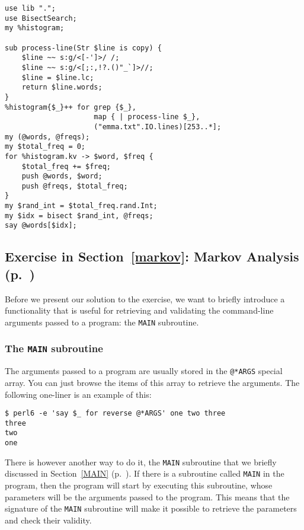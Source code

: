\begin{verbatim}
use lib ".";
use BisectSearch;
my %histogram;

sub process-line(Str $line is copy) {
    $line ~~ s:g/<[-']>/ /; 
    $line ~~ s:g/<[;:,!?.()"_`]>//; 
    $line = $line.lc; 
    return $line.words;
}
%histogram{$_}++ for grep {$_},
                     map { | process-line $_}, 
                     ("emma.txt".IO.lines)[253..*]; 
my (@words, @freqs);
my $total_freq = 0;
for %histogram.kv -> $word, $freq {
    $total_freq += $freq;
    push @words, $word;
    push @freqs, $total_freq;
}
my $rand_int = $total_freq.rand.Int;
my $idx = bisect $rand_int, @freqs;
say @words[$idx];
\end{verbatim}

\subsection{Exercise in Section~\ref{markov}: Markov Analysis (p.~\pageref{markov_analysis})}
\label{sol_markov_analysis}

Before we present our solution to the exercise, we want 
to briefly introduce a functionality that is useful for 
retrieving and validating the command-line arguments passed 
to a program: the {\tt MAIN} subroutine.

\subsubsection{The {\tt MAIN} subroutine}
\label{MAIN_sub}

The arguments passed to a program are usually stored in the 
\verb'@*ARGS' special array. You can just browse the items of this 
array to retrieve the arguments. The following one-liner is 
an example of this:

\begin{verbatim}
$ perl6 -e 'say $_ for reverse @*ARGS' one two three
three
two
one
\end{verbatim}

There is however another way to do it, the {\tt MAIN} 
subroutine that we briefly discussed in Section~\ref{MAIN} 
(p.~\pageref{MAIN}). If there is a subroutine 
called {\tt MAIN} in the program, then the program will start 
by executing this subroutine, whose parameters will be the 
arguments passed to the program. This means that the signature 
of the {\tt MAIN} subroutine will make it possible to retrieve the 
parameters and check their validity.

